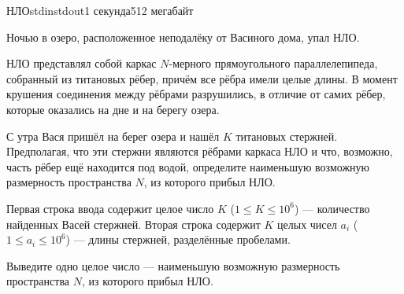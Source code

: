 \begin{problem}{НЛО}{stdin}{stdout}{1 секунда}{512 мегабайт}

Ночью в озеро, расположенное неподалёку от Васиного дома, упал НЛО.

НЛО представлял собой каркас $N$-мерного прямоугольного параллелепипеда, собранный из титановых рёбер, причём все рёбра имели целые длины. В момент крушения
соединения между рёбрами разрушились, в отличие от самих рёбер, которые оказались на дне и на берегу озера.

С утра Вася пришёл на берег озера и нашёл $K$ титановых стержней. Предполагая, что эти стержни являются рёбрами каркаса НЛО и что, возможно,
часть рёбер ещё находится под водой, определите наименьшую возможную размерность пространства $N$, из которого прибыл НЛО.


\InputFile
Первая строка ввода содержит целое число  $K$ ($1 \le K \le 10^6$) --- количество найденных Васей стержней. 
Вторая строка содержит $K$ целых чисел $a_i$ ($1 \le a_i \le 10^6$) --- длины стержней, разделённые пробелами.


\OutputFile
Выведите одно целое число --- наименьшую возможную размерность пространства $N$, из которого прибыл НЛО.

\Examples

\begin{example}
%
%
\end{example}

\end{problem}
